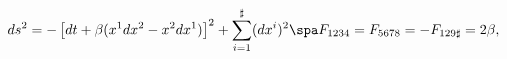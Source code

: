 \begin{equation}
\label{metgodeln1}
ds^2 = - \left[ dt + \beta (x^1 dx^2 - x^2 dx^1) \right]^2  
+ \sum_{i=1}^{\sharp} ( dx^i )^2  
\spa
F_{1234} = F_{5678} = - F_{129 \sharp} = 2\beta,
\end{equation}


